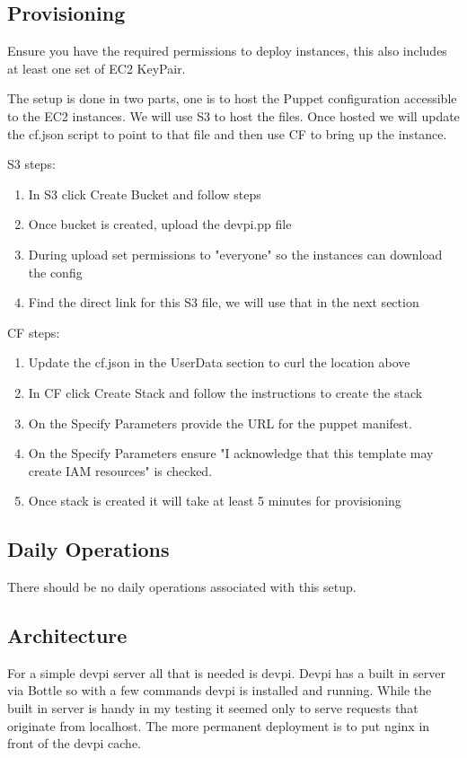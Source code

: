 \documentclass[12pt, letterpaper]{article}
\begin{document}
\subsection{Provisioning}
Ensure you have the required permissions to deploy instances, this also includes at least one set of EC2 KeyPair.

The setup is done in two parts, one is to host the Puppet configuration accessible to the EC2 instances. We will use
S3 to host the files. Once hosted we will update the cf.json script to point to that file and then use CF to bring
up the instance.

S3 steps:
\begin{enumerate}
    \item In S3 click Create Bucket and follow steps
    \item Once bucket is created, upload the devpi.pp file
    \item During upload set permissions to "everyone" so the instances can download the config
    \item Find the direct link for this S3 file, we will use that in the next section
\end{enumerate}

CF steps:
\begin{enumerate}
    \item Update the cf.json in the UserData section to curl the location above
    \item In CF click Create Stack and follow the instructions to create the stack
    \item On the Specify Parameters provide the URL for the puppet manifest.  
    \item On the Specify Parameters ensure "I acknowledge that this template may create IAM resources" is checked.  
    \item Once stack is created it will take at least 5 minutes for provisioning
\end{enumerate}

\subsection{Daily Operations}
There should be no daily operations associated with this setup.


\subsection{Architecture}
For a simple devpi server all that is needed is devpi. Devpi has a built in server via Bottle so with a few
commands devpi is installed and running. While the built in server is handy in my testing it seemed only to
serve requests that originate from localhost. The more permanent deployment is to put nginx in front of the
devpi cache.
\end{document}
